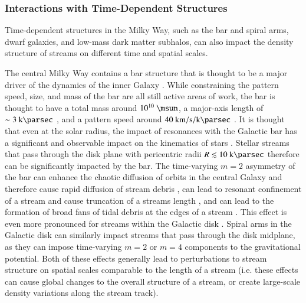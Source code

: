 \documentclass[final,5p,times,twocolumn,authoryear]{elsarticle}
\begin{document}
\subsubsection{Interactions with Time-Dependent Structures}

Time-dependent structures in the Milky Way, such as the bar and spiral arms, dwarf
galaxies, and low-mass dark matter subhalos, can also impact the density structure of
streams on different time and spatial scales.

The central Milky Way contains a bar structure that is thought to be a major driver of
the dynamics of the inner Galaxy \citep[e.g.,][]{blitz:1991}.
While constraining the pattern speed, size, and mass of the bar are all still active
areas of work, the bar is thought to have a total mass around $10^{10}~\unit{\msun}$, a
major-axis length of $\sim 3~\kpc$ \citep[e.g.,][]{wegg:2015}, and a pattern speed
around $40~\unit{\kms\per\kpc}$ \citep[e.g.,][]{portail:2017, sanders:2019}.
It is thought that even at the solar radius, the impact of resonances with the Galactic
bar has a significant and observable impact on the kinematics of stars
\citep[e.g.,][]{dehnen:1999, kawata:2021}.
Stellar streams that pass through the disk plane with pericentric radii $R \lesssim
10~\kpc$ therefore can be significantly impacted by the bar.
The time-varying $m=2$ asymmetry of the bar can enhance the chaotic diffusion of orbits
in the central Galaxy and therefore cause rapid diffusion of stream debris
\citep{price-whelan:2016b}, can lead to resonant confinement of a stream and cause
truncation of a streams length \citep{hattori:2016}, and can lead to the formation of
broad fans of tidal debris at the edges of a stream \citep{pearson:2017}.
This effect is even more pronounced for streams within the Galactic disk
\citep{thomas:2023}.
Spiral arms in the Galactic disk can similarly impact streams that pass through the disk
midplane, as they can impose time-varying $m=2$ or $m=4$ components to the gravitational
potential.
Both of these effects generally lead to perturbations to stream structure on spatial
scales comparable to the length of a stream (i.e. these effects can cause global changes
to the overall structure of a stream, or create large-scale density variations along the
stream track).
\end{document}
